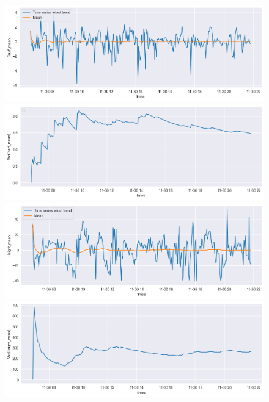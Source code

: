 \documentclass[12pt, bachelor, substylefile = algo_title.rtx]{disser}
\theoremstyle{definition}
\begin{document}
\begin{figure}[!h]
\begin{minipage}{.48\textwidth}
   \end{minipage}
   \begin{minipage}{.48\textwidth}
     \includegraphics[width=\linewidth]{mean3}
   \end{minipage} \hfill
\begin{minipage}{.48\textwidth}
     \includegraphics[width=\linewidth]{var3}
   \end{minipage}
   \begin{minipage}{.48\textwidth}
     \includegraphics[width=\linewidth]{mean4}
   \end{minipage} \hfill
\begin{minipage}{.48\textwidth}
     \includegraphics[width=\linewidth]{var4}

\end{minipage}
\end{figure}
\end{document}
